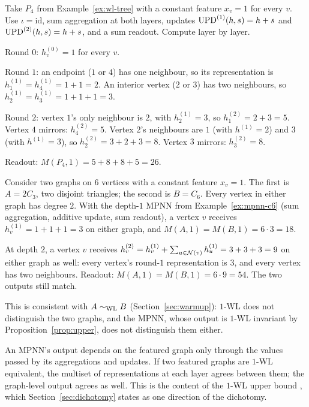 \begin{example}\label{ex:mpnn-p4}
Take $P_4$ from Example~\ref{ex:wl-tree} with a constant feature $x_v = 1$
for every $v$. Use $\iota = \mathrm{id}$, sum aggregation at both
layers, updates $\mathrm{UPD}^{(1)}(h, s) = h + s$ and $\mathrm{UPD}^{(2)}(h, s) =
h + s$, and a sum readout. Compute layer by layer.

Round $0$: $h_v^{(0)} = 1$ for every $v$.

Round $1$: an endpoint ($1$ or $4$) has one neighbour, so its
representation is $h_1^{(1)} = h_4^{(1)} = 1 + 1 = 2$. An interior
vertex ($2$ or $3$) has two neighbours, so $h_2^{(1)} = h_3^{(1)} =
1 + 1 + 1 = 3$.

Round $2$: vertex $1$'s only neighbour is $2$, with $h_2^{(1)} = 3$,
so $h_1^{(2)} = 2 + 3 = 5$. Vertex $4$ mirrors: $h_4^{(2)} = 5$.
Vertex $2$'s neighbours are $1$ (with $h^{(1)} = 2$) and $3$ (with
$h^{(1)} = 3$), so $h_2^{(2)} = 3 + 2 + 3 = 8$. Vertex $3$ mirrors:
$h_3^{(2)} = 8$.

Readout: $M(P_4, 1) = 5 + 8 + 8 + 5 = 26$.
\end{example}

\begin{example}\label{ex:mpnn-depth}
Consider two graphs on $6$ vertices with a constant feature $x_v =
1$. The first is $A = 2 C_3$, two disjoint triangles; the second is
$B = C_6$. Every vertex in either graph has degree $2$. With the
depth-$1$ MPNN from Example~\ref{ex:mpnn-c6} (sum aggregation, additive
update, sum readout), a vertex $v$ receives $h_v^{(1)} = 1 + 1 + 1 =
3$ on either graph, and $M(A, 1) = M(B, 1) = 6 \cdot 3 = 18$.

At depth $2$, a vertex $v$ receives $h_v^{(2)} = h_v^{(1)} +
\sum_{u \in \mathcal{N}(v)} h_u^{(1)} = 3 + 3 + 3 = 9$ on either graph
as well: every vertex's round-$1$ representation is $3$, and every
vertex has two neighbours. Readout: $M(A, 1) = M(B, 1) = 6 \cdot 9
= 54$. The two outputs still match.

This is consistent with $A \sim_{\mathrm{WL}} B$ (Section~\ref{sec:warmup}): $1$-WL
does not distinguish the two graphs, and the MPNN, whose output is
$1$-WL invariant by Proposition~\ref{prop:upper}, does not distinguish them
either.
\end{example}

An MPNN's output depends on the featured graph only through the
values passed by its aggregations and updates. If two featured graphs
are $1$-WL equivalent, the multiset of representations at each layer
agrees between them; the graph-level output agrees as well. This is
the content of the $1$-WL upper bound \citep{MorrisWL2019, XuGIN2019},
which Section~\ref{sec:dichotomy} states as one direction of the dichotomy.

